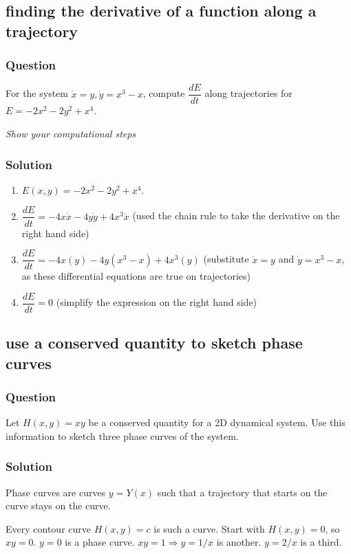 \documentclass[12pt,letterpaper,noanswers]{exam}
\begin{document}
\subsection{finding the derivative of a function along a trajectory}
\subsubsection{Question}
 For the system $\dot x = y, \dot y = x^3-x$, compute $\dfrac{dE}{dt}$ along trajectories for $E =-2 x^2 - 2y^2 + x^4$.

\emph{Show your computational steps}

\subsubsection{Solution}
\begin{enumerate}
\item $E(x,y) = -2x^2 - 2y^2 + x^4.$
\item $\dfrac{dE}{dt} = -4x \dot{x} - 4y\dot{y} + 4x^3\dot x$ (used the chain rule to take the derivative on the right hand side)
\item $\dfrac{dE}{dt} = -4x(y) - 4y(x^3-x) + 4x^3(y)$ (substitute $\dot x = y$ and $\dot y = x^3-x$, as these differential equations are true on trajectories)
\item $\dfrac{dE}{dt} = 0$ (simplify the expression on the right hand side)
\end{enumerate}

\subsection{use a conserved quantity to sketch phase curves}
\subsubsection{Question}
 Let $H(x,y) = xy$ be a conserved quantity for a 2D dynamical system.  Use this information to sketch three phase curves of the system.
 
\subsubsection{Solution}

Phase curves are curves $y=Y(x)$ such that a trajectory that starts on the curve stays on the curve.

Every contour curve $H(x,y) = c$ is such a curve.  Start with $H(x,y) = 0$, so $xy = 0$.  $y = 0$ is a phase curve.  $xy = 1 \Rightarrow y = 1/x$ is another.  $y = 2/x$ is a third.
\end{document}

